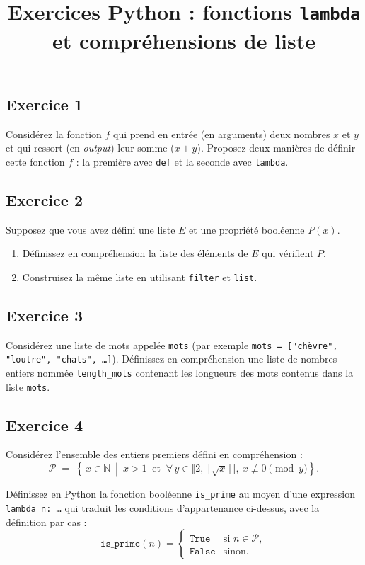 \documentclass[11pt,a4paper]{article}
\title{Exercices Python : fonctions \texttt{lambda} et compréhensions de liste}
\date{}
\begin{document}
\maketitle

\subsection*{Exercice 1}
Considérez la fonction $f$ qui prend en entrée (en arguments) deux nombres $x$ et $y$ et qui ressort (en \emph{output}) leur somme ($x+y$).
Proposez deux manières de définir cette fonction $f$ : la première avec \texttt{def} et la seconde avec \texttt{lambda}.

\subsection*{Exercice 2}
Supposez que vous avez défini une liste $E$ et une propriété booléenne $P(x)$.
\begin{enumerate}
  \item Définissez en compréhension la liste des éléments de $E$ qui vérifient $P$.
  \item Construisez la même liste en utilisant \texttt{filter} et \texttt{list}.
\end{enumerate}

\subsection*{Exercice 3}
Considérez une liste de mots appelée \texttt{mots} (par exemple \texttt{mots = ["chèvre", "loutre", "chats", \dots]}).
Définissez en compréhension une liste de nombres entiers nommée \texttt{length\_mots} contenant les longueurs des mots contenus dans la liste \texttt{mots}.

\subsection*{Exercice 4}
Considérez l’ensemble des entiers premiers défini en compréhension :
\[
\mathcal{P} \;=\; \left\{\, x \in \mathbb{N} \ \middle|\ x>1 \ \text{ et }\ \forall\, y \in \llbracket 2,\ \lfloor \sqrt{x} \rfloor \rrbracket,\ x \not\equiv 0 \pmod{y} \right\}.
\]

Définissez en Python la fonction booléenne \texttt{is\_prime} au moyen d’une expression \texttt{lambda n: \dots} qui traduit les conditions d’appartenance ci-dessus, avec la définition par cas :
\[
\texttt{is\_prime}(n)=
\begin{cases}
\texttt{True} & \text{si } n\in\mathcal{P},\\
\texttt{False} & \text{sinon.}
\end{cases}
\]
\end{document}
